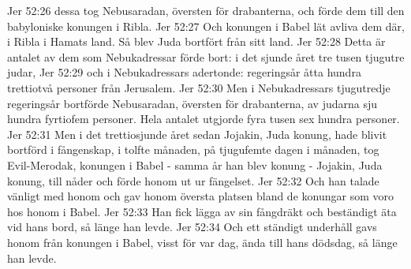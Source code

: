 Jer 52:26  dessa tog Nebusaradan, översten för drabanterna, och förde dem till den babyloniske konungen i Ribla.
Jer 52:27  Och konungen i Babel lät avliva dem där, i Ribla i Hamats land. Så blev Juda bortfört från sitt land.
Jer 52:28  Detta är antalet av dem som Nebukadressar förde bort: i det sjunde året tre tusen tjugutre judar,
Jer 52:29  och i Nebukadressars adertonde: regeringsår åtta hundra trettiotvå personer från Jerusalem.
Jer 52:30  Men i Nebukadressars tjugutredje regeringsår bortförde Nebusaradan, översten för drabanterna, av judarna sju hundra fyrtiofem personer. Hela antalet utgjorde fyra tusen sex hundra personer.
Jer 52:31  Men i det trettiosjunde året sedan Jojakin, Juda konung, hade blivit bortförd i fångenskap, i tolfte månaden, på tjugufemte dagen i månaden, tog Evil-Merodak, konungen i Babel - samma år han blev konung - Jojakin, Juda konung, till nåder och förde honom ut ur fängelset.
Jer 52:32  Och han talade vänligt med honom och gav honom översta platsen bland de konungar som voro hos honom i Babel.
Jer 52:33  Han fick lägga av sin fångdräkt och beständigt äta vid hans bord, så länge han levde.
Jer 52:34  Och ett ständigt underhåll gavs honom från konungen i Babel, visst för var dag, ända till hans dödsdag, så länge han levde.


